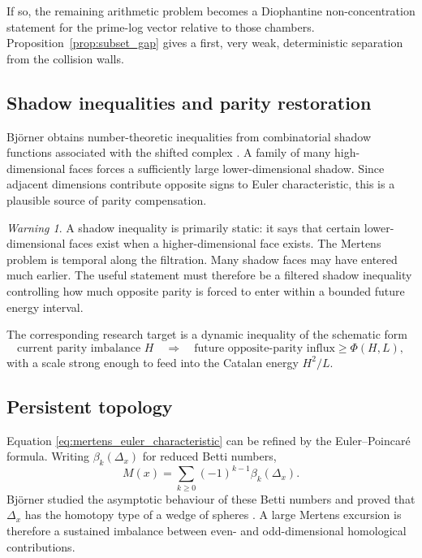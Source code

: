 \documentclass[11pt]{amsart}
\numberwithin{equation}{section}
\theoremstyle{plain}
\theoremstyle{definition}
\theoremstyle{remark}
\newtheorem{warning}[theorem]{Warning}
\newcommand{\Mert}{M}
\begin{document}
If so, the remaining arithmetic problem becomes a Diophantine non-concentration statement for the prime-log vector relative to those chambers.  Proposition~\ref{prop:subset_gap} gives a first, very weak, deterministic separation from the collision walls.

\subsection{Shadow inequalities and parity restoration}
\label{subsec:shadow_restoration}

Bj\"orner obtains number-theoretic inequalities from combinatorial shadow functions associated with the shifted complex \cite{Bjorner2011}.  A family of many high-dimensional faces forces a sufficiently large lower-dimensional shadow.  Since adjacent dimensions contribute opposite signs to Euler characteristic, this is a plausible source of parity compensation.

\begin{warning}
\label{warn:shadow_temporal_gap}
A shadow inequality is primarily static: it says that certain lower-dimensional faces exist when a higher-dimensional face exists.  The Mertens problem is temporal along the filtration.  Many shadow faces may have entered much earlier.  The useful statement must therefore be a filtered shadow inequality controlling how much opposite parity is forced to enter within a bounded future energy interval.
\end{warning}

The corresponding research target is a dynamic inequality of the schematic form
\begin{equation}
\text{current parity imbalance }H
\quad\Longrightarrow\quad
\text{future opposite-parity influx}\ge \Phi(H,L),
\label{eq:dynamic_shadow_target}
\end{equation}
with a scale strong enough to feed into the Catalan energy $H^2/L$.

\subsection{Persistent topology}
\label{subsec:persistent_topology}

Equation \eqref{eq:mertens_euler_characteristic} can be refined by the Euler--Poincar\'e formula.  Writing $\beta_k(\Delta_x)$ for reduced Betti numbers,
\begin{equation}
\Mert(x)
=
\sum_{k\ge0}(-1)^{k-1}\beta_k(\Delta_x).
\label{eq:mertens_betti_alternation}
\end{equation}
Björner studied the asymptotic behaviour of these Betti numbers and proved that $\Delta_x$ has the homotopy type of a wedge of spheres \cite{Bjorner2011}.  A large Mertens excursion is therefore a sustained imbalance between even- and odd-dimensional homological contributions.
\end{document}
